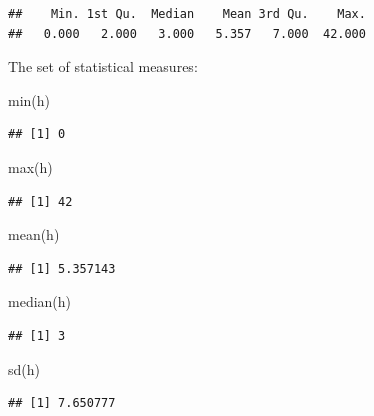 \documentclass[
]{book}
\newenvironment{Shaded}{\begin{snugshade}}{\end{snugshade}}
\newcommand{\FunctionTok}[1]{\textcolor[rgb]{0.00,0.00,0.00}{#1}}
\newcommand{\NormalTok}[1]{#1}
\begin{document}
\begin{verbatim}
##    Min. 1st Qu.  Median    Mean 3rd Qu.    Max. 
##   0.000   2.000   3.000   5.357   7.000  42.000
\end{verbatim}

The set of statistical measures:

\begin{Shaded}
\begin{Highlighting}[]
\FunctionTok{min}\NormalTok{(h)}
\end{Highlighting}
\end{Shaded}

\begin{verbatim}
## [1] 0
\end{verbatim}

\begin{Shaded}
\begin{Highlighting}[]
\FunctionTok{max}\NormalTok{(h)}
\end{Highlighting}
\end{Shaded}

\begin{verbatim}
## [1] 42
\end{verbatim}

\begin{Shaded}
\begin{Highlighting}[]
\FunctionTok{mean}\NormalTok{(h)}
\end{Highlighting}
\end{Shaded}

\begin{verbatim}
## [1] 5.357143
\end{verbatim}

\begin{Shaded}
\begin{Highlighting}[]
\FunctionTok{median}\NormalTok{(h)}
\end{Highlighting}
\end{Shaded}

\begin{verbatim}
## [1] 3
\end{verbatim}

\begin{Shaded}
\begin{Highlighting}[]
\FunctionTok{sd}\NormalTok{(h)}
\end{Highlighting}
\end{Shaded}

\begin{verbatim}
## [1] 7.650777
\end{verbatim}
\end{document}
